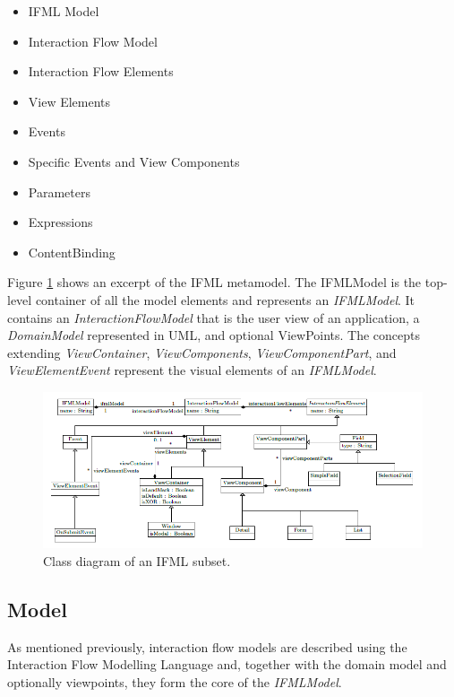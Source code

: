 \begin{itemize}
  \item IFML Model
  \item Interaction Flow Model
  \item Interaction Flow Elements
  \item View Elements
  \item Events
  \item Specific Events and View Components
  \item Parameters
  \item Expressions
  \item ContentBinding
\end{itemize}

Figure \ref{fig:simple-ifml-core-model} shows an excerpt of the IFML metamodel. The IFMLModel is the top-level container of all the model elements and represents an \textit{IFMLModel}. It contains an \textit{InteractionFlowModel} that is the user view of an application, a \textit{DomainModel} represented in UML, and optional ViewPoints. The concepts extending \textit{ViewContainer}, \textit{ViewComponents}, \textit{ViewComponentPart}, and \textit{ViewElementEvent} represent the visual elements of an \textit{IFMLModel}.

\vspace{0.5cm}
\begin{figure}[H]
  \centering
    \includegraphics[width=15cm]{images/diagrams/ifml-metamodel.png}
  \caption{Class diagram of an IFML subset.}
  \label{fig:simple-ifml-core-model}
\end{figure}
\vspace{0.5cm}

\subsection{Model}

As mentioned previously, interaction flow models are described using the Interaction Flow Modelling Language and, together with the domain model and optionally viewpoints, they form the core of the \textit{IFMLModel}.

